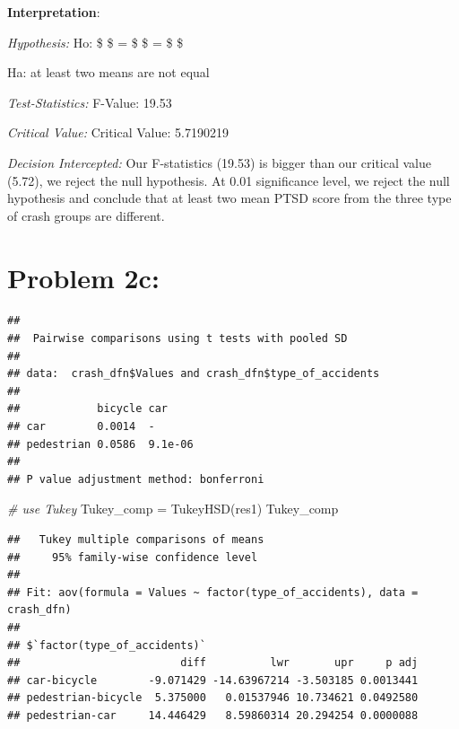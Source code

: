 \documentclass[
]{article}
\newenvironment{Shaded}{\begin{snugshade}}{\end{snugshade}}
\newcommand{\AttributeTok}[1]{\textcolor[rgb]{0.77,0.63,0.00}{#1}}
\newcommand{\CommentTok}[1]{\textcolor[rgb]{0.56,0.35,0.01}{\textit{#1}}}
\newcommand{\FunctionTok}[1]{\textcolor[rgb]{0.00,0.00,0.00}{#1}}
\newcommand{\NormalTok}[1]{#1}
\newcommand{\OtherTok}[1]{\textcolor[rgb]{0.56,0.35,0.01}{#1}}
\newcommand{\SpecialCharTok}[1]{\textcolor[rgb]{0.00,0.00,0.00}{#1}}
\newcommand{\StringTok}[1]{\textcolor[rgb]{0.31,0.60,0.02}{#1}}
\begin{document}
\textbf{Interpretation}:

\emph{Hypothesis:} Ho: \$ \$ = \$ \$ = \$ \$

Ha: at least two means are not equal

\emph{Test-Statistics:} F-Value: 19.53

\emph{Critical Value:} Critical Value: 5.7190219

\emph{Decision Intercepted:} Our F-statistics (19.53) is bigger than our
critical value (5.72), we reject the null hypothesis. At 0.01
significance level, we reject the null hypothesis and conclude that at
least two mean PTSD score from the three type of crash groups are
different.

\hypertarget{problem-2c}{%
\section{Problem 2c:}\label{problem-2c}}

\begin{Shaded}
\end{Shaded}

\begin{verbatim}
## 
##  Pairwise comparisons using t tests with pooled SD 
## 
## data:  crash_dfn$Values and crash_dfn$type_of_accidents 
## 
##            bicycle car    
## car        0.0014  -      
## pedestrian 0.0586  9.1e-06
## 
## P value adjustment method: bonferroni
\end{verbatim}

\begin{Shaded}
\begin{Highlighting}[]
\CommentTok{\# use Tukey}
\NormalTok{Tukey\_comp }\OtherTok{=} \FunctionTok{TukeyHSD}\NormalTok{(res1)}
\NormalTok{Tukey\_comp}
\end{Highlighting}
\end{Shaded}

\begin{verbatim}
##   Tukey multiple comparisons of means
##     95% family-wise confidence level
## 
## Fit: aov(formula = Values ~ factor(type_of_accidents), data = crash_dfn)
## 
## $`factor(type_of_accidents)`
##                         diff          lwr       upr     p adj
## car-bicycle        -9.071429 -14.63967214 -3.503185 0.0013441
## pedestrian-bicycle  5.375000   0.01537946 10.734621 0.0492580
## pedestrian-car     14.446429   8.59860314 20.294254 0.0000088
\end{verbatim}
\end{document}
